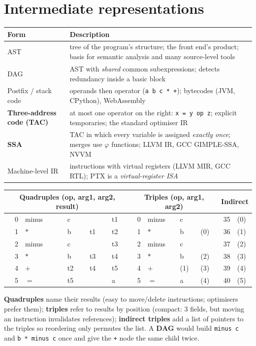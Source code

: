\documentclass[10pt,a4paper,openany,oneside]{report}
\newcommand{\prio}[1]{\texorpdfstring{\ifcase#1\or{\color{gold}\ding{72}}\or{\color{gold}\ding{72}\ding{72}}\or{\color{gold}\ding{72}\ding{72}\ding{72}}\fi}{}}
\begin{document}
\section{Intermediate representations \prio{3}}
\begin{center}\small
\begin{xltabular}{\textwidth}{@{}L{3.3cm}Y@{}}
\toprule
\textbf{Form} & \textbf{Description}\\
\midrule\endhead
AST & tree of the program's structure; the front end's product; basis for semantic analysis and many source-level tools\\
DAG & AST with \emph{shared} common subexpressions; detects redundancy inside a basic block\\
Postfix / stack code & operands then operator (\texttt{a b c * +}); bytecodes (JVM, CPython), WebAssembly\\
\textbf{Three-address code (TAC)} & at most one operator on the right: \texttt{x = y op z}; explicit temporaries; the standard optimiser IR\\
\textbf{SSA} & TAC in which every variable is assigned \emph{exactly once}; merges use $\varphi$ functions; LLVM IR, GCC GIMPLE-SSA, NVVM\\
Machine-level IR & instructions with virtual registers (LLVM MIR, GCC RTL); PTX is a \emph{virtual-register ISA}\\
\bottomrule
\end{xltabular}
\end{center}
\begin{exbox}[Quadruples, triples, indirect triples for \texttt{a = b * -c + b * -c}]
\begin{center}\small
\begin{tabular}{@{}rllll@{\hspace{1.2cm}}rlll@{\hspace{1.2cm}}rl@{}}
\toprule
\multicolumn{5}{c}{\textbf{Quadruples} (op, arg1, arg2, result)} & \multicolumn{4}{c}{\textbf{Triples} (op, arg1, arg2)} & \multicolumn{2}{c}{\textbf{Indirect}}\\
\midrule
0 & minus & c & & t1 & 0 & minus & c & & 35 & (0)\\
1 & $*$ & b & t1 & t2 & 1 & $*$ & b & (0) & 36 & (1)\\
2 & minus & c & & t3 & 2 & minus & c & & 37 & (2)\\
3 & $*$ & b & t3 & t4 & 3 & $*$ & b & (2) & 38 & (3)\\
4 & $+$ & t2 & t4 & t5 & 4 & $+$ & (1) & (3) & 39 & (4)\\
5 & $=$ & t5 & & a & 5 & $=$ & a & (4) & 40 & (5)\\
\bottomrule
\end{tabular}
\end{center}
\textbf{Quadruples} name their results (easy to move/delete instructions; optimisers prefer them); \textbf{triples} refer to results by position (compact: 3 fields, but moving an instruction invalidates references); \textbf{indirect triples} add a list of pointers to the triples so reordering only permutes the list. A \textbf{DAG} would build \texttt{minus c} and \texttt{b * minus c} once and give the \texttt{+} node the same child twice.
\end{exbox}
\end{document}

